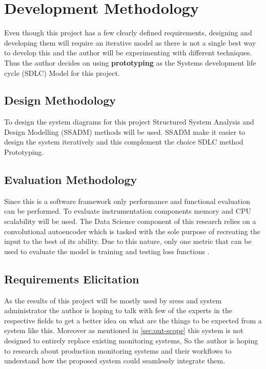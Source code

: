 \section{Development Methodology}

Even though this project has a few clearly defined requirements, designing and developing them will require an iterative model as there is not a single best way to develop this and the author will be experimenting with different techniques. Thus the author decides on using \textbf{prototyping} as the Systems development life cycle (SDLC) Model for this project.\\

\subsection{Design Methodology}

To design the system diagrams for this project Structured System Analysis and Design Modelling (SSADM) methods will be used. SSADM make it easier to design the system iteratively and this complement the choice SDLC method Prototyping.

\subsection{Evaluation Methodology}

Since this is a software framework only performance and functional evaluation can be performed. To evaluate instrumentation components memory and CPU scalability will be used. The Data Science component of this research relies on a convolutional autoencoder which is tasked with the sole purpose of recreating the input to the best of its ability. Due to this nature, only one metric that can be used to evaluate the model is training and testing loss functions \citep{gondara2016medical}. 

\subsection{Requirements Elicitation}

As the results of this project will be mostly used by \acp{sres} and system administrator the author is hoping to talk with few of the experts in the respective fields to get a better idea on what are the things to be expected from a system like this. Moreover as mentioned in \ref{sec:out-scope} this system is not designed to entirely replace existing monitoring systems, So the author is hoping to research about production monitoring systems and their workflows to understand how the proposed system could seamlessly integrate them. 

